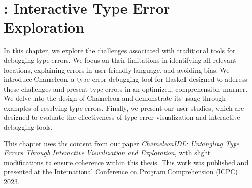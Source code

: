\graphicspath{{Figures/Chameleon}}

\chapter{\chameleon{}: Interactive Type Error Exploration}


\label{chap:chameleon} 

In this chapter, we explore the challenges associated with traditional tools for debugging type errors. We focus on their limitations in identifying all relevant locations, explaining errors in user-friendly language, and avoiding bias. We introduce Chameleon, a type error debugging tool for Haskell designed to address these challenges and present type errors in an optimized, comprehensible manner. We delve into the design of Chameleon and demonstrate its usage through examples of resolving type errors. Finally, we present our user studies, which are designed to evaluate the effectiveness of type error visualization and interactive debugging tools.


 This chapter uses the content from our paper \textit{ChameleonIDE: Untangling Type Errors Through Interactive Visualization and
Exploration}, with slight modifications to ensure coherence within this thesis. This work was published and presented at the International Conference on Program Comprehension (ICPC) 2023.







